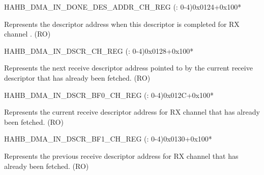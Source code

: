 \begin{register}{H}{AHB\_DMA\_IN\_DONE\_DES\_ADDR\_CH\_REG (: 0-4)}{0x0124+0x100*}\label{regdesc:AHBDMAINDONEDESADDRCHNREG}
%
\regnewline%
\begin{regdesc}\begin{reglist}
\label{fielddesc:AHBDMAINDONEDESADDRCHN}\item [AHB\_DMA\_IN\_DONE\_DES\_ADDR\_CH\regindex{n}] Represents the descriptor address when this descriptor is completed for RX channel . (RO)
\end{reglist}\end{regdesc}
\end{register}


\begin{register}{H}{AHB\_DMA\_IN\_DSCR\_CH\_REG (: 0-4)}{0x0128+0x100*}\label{regdesc:AHBDMAINDSCRCHNREG}
%
\regnewline%
\begin{regdesc}\begin{reglist}
\label{fielddesc:AHBDMAINLINKDSCRCHN}\item [AHB\_DMA\_INLINK\_DSCR\_CH\regindex{n}] Represents the next receive descriptor address pointed to by the current receive descriptor that has already been fetched. (RO)
\end{reglist}\end{regdesc}
\end{register}


\begin{register}{H}{AHB\_DMA\_IN\_DSCR\_BF0\_CH\_REG (: 0-4)}{0x012C+0x100*}\label{regdesc:AHBDMAINDSCRBF0CHNREG}
%
\regnewline%
\begin{regdesc}\begin{reglist}
\label{fielddesc:AHBDMAINLINKDSCRBF0CHN}\item [AHB\_DMA\_INLINK\_DSCR\_BF0\_CH\regindex{n}] Represents the current receive descriptor address for RX channel  that has already been fetched. (RO)
\end{reglist}\end{regdesc}
\end{register}


\begin{register}{H}{AHB\_DMA\_IN\_DSCR\_BF1\_CH\_REG (: 0-4)}{0x0130+0x100*}\label{regdesc:AHBDMAINDSCRBF1CHNREG}
%
\regnewline%
\begin{regdesc}\begin{reglist}
\label{fielddesc:AHBDMAINLINKDSCRBF1CHN}\item [AHB\_DMA\_INLINK\_DSCR\_BF1\_CH\regindex{n}] Represents the previous receive descriptor address for RX channel  that has already been fetched. (RO)
\end{reglist}\end{regdesc}
\end{register}


